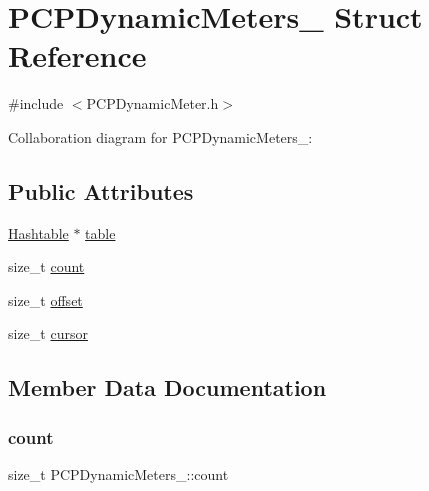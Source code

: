 \hypertarget{structPCPDynamicMeters__}{}\section{P\+C\+P\+Dynamic\+Meters\+\_\+ Struct Reference}
\label{structPCPDynamicMeters__}


{\ttfamily \#include $<$P\+C\+P\+Dynamic\+Meter.\+h$>$}



Collaboration diagram for P\+C\+P\+Dynamic\+Meters\+\_\+\+:
\subsection*{Public Attributes}
\begin{DoxyCompactItemize}
\item 
\hyperlink{Hashtable_8h_af67f943dab16c5d7d465c18053edf47f}{Hashtable} $\ast$ \hyperlink{structPCPDynamicMeters___af6c7c9dc413717d0f516097990595150}{table}
\item 
size\+\_\+t \hyperlink{structPCPDynamicMeters___a7f927fab30416243883491a103937005}{count}
\item 
size\+\_\+t \hyperlink{structPCPDynamicMeters___a59b644e112a64b105ac0eed90c1e44e8}{offset}
\item 
size\+\_\+t \hyperlink{structPCPDynamicMeters___ae7399e186c9a3b0c15ea600794fc975d}{cursor}
\end{DoxyCompactItemize}


\subsection{Member Data Documentation}
\mbox{\label{structPCPDynamicMeters___a7f927fab30416243883491a103937005}} 
\subsubsection{\texorpdfstring{count}{count}}
{\footnotesize\ttfamily size\+\_\+t P\+C\+P\+Dynamic\+Meters\+\_\+\+::count}

\mbox{\label{structPCPDynamicMeters___ae7399e186c9a3b0c15ea600794fc975d}} 
